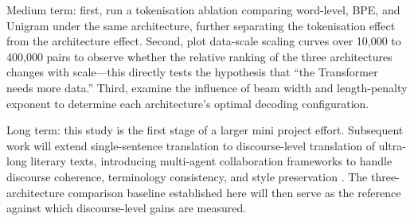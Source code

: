\documentclass[a4paper,12pt]{vpcoe}
\begin{document}
Medium term: first, run a tokenisation ablation comparing word-level, BPE, and Unigram under the same architecture, further separating the tokenisation effect from the architecture effect. Second, plot data-scale scaling curves over 10,000 to 400,000 pairs to observe whether the relative ranking of the three architectures changes with scale---this directly tests the hypothesis that ``the Transformer needs more data.'' Third, examine the influence of beam width and length-penalty exponent to determine each architecture's optimal decoding configuration.

Long term: this study is the first stage of a larger mini project effort. Subsequent work will extend single-sentence translation to discourse-level translation of ultra-long literary texts, introducing multi-agent collaboration frameworks to handle discourse coherence, terminology consistency, and style preservation \cite{koehn2017}. The three-architecture comparison baseline established here will then serve as the reference against which discourse-level gains are measured.

\end{document}
